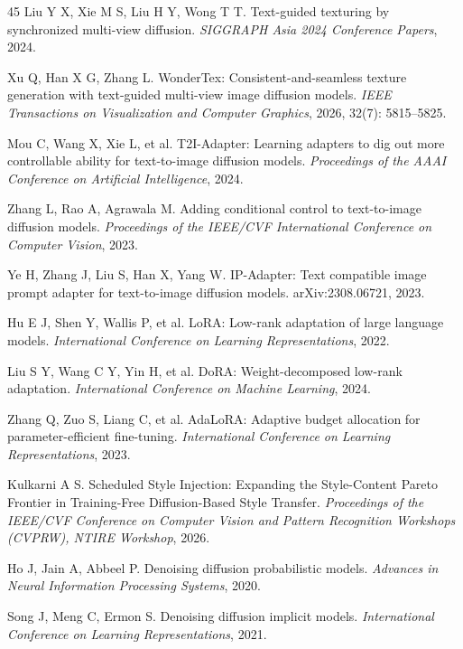 \documentclass[times,twocolumn,final]{elsarticle}
\begin{document}
\begin{thebibliography}{45}
Liu Y X, Xie M S, Liu H Y, Wong T T. Text-guided texturing by synchronized multi-view diffusion. \textit{SIGGRAPH Asia 2024 Conference Papers}, 2024.

Xu Q, Han X G, Zhang L. WonderTex: Consistent-and-seamless texture generation with text-guided multi-view image diffusion models. \textit{IEEE Transactions on Visualization and Computer Graphics}, 2026, 32(7): 5815--5825.

Mou C, Wang X, Xie L, et al. T2I-Adapter: Learning adapters to dig out more controllable ability for text-to-image diffusion models. \textit{Proceedings of the AAAI Conference on Artificial Intelligence}, 2024.

Zhang L, Rao A, Agrawala M. Adding conditional control to text-to-image diffusion models. \textit{Proceedings of the IEEE/CVF International Conference on Computer Vision}, 2023.

Ye H, Zhang J, Liu S, Han X, Yang W. IP-Adapter: Text compatible image prompt adapter for text-to-image diffusion models. arXiv:2308.06721, 2023.

Hu E J, Shen Y, Wallis P, et al. LoRA: Low-rank adaptation of large language models. \textit{International Conference on Learning Representations}, 2022.

Liu S Y, Wang C Y, Yin H, et al. DoRA: Weight-decomposed low-rank adaptation. \textit{International Conference on Machine Learning}, 2024.

Zhang Q, Zuo S, Liang C, et al. AdaLoRA: Adaptive budget allocation for parameter-efficient fine-tuning. \textit{International Conference on Learning Representations}, 2023.

Kulkarni A S. Scheduled Style Injection: Expanding the Style-Content Pareto Frontier in Training-Free Diffusion-Based Style Transfer. \textit{Proceedings of the IEEE/CVF Conference on Computer Vision and Pattern Recognition Workshops (CVPRW), NTIRE Workshop}, 2026.

Ho J, Jain A, Abbeel P. Denoising diffusion probabilistic models. \textit{Advances in Neural Information Processing Systems}, 2020.

Song J, Meng C, Ermon S. Denoising diffusion implicit models. \textit{International Conference on Learning Representations}, 2021.


\end{thebibliography}
\end{document}
